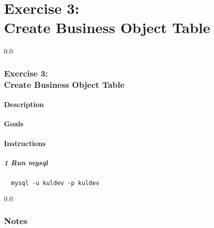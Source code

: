 \part*{Exercise 3: \\
Create Business Object Table}

{\setlength{\baselineskip}%
  {0.0\baselineskip}
  \section*{\flushright Exercise 3: \\
Create Business Object Table}
  \hrulefill \par}

\subsection*{Description}

\subsection*{Goals}

\subsection*{Instructions}
\subsubsection*{1 Run mysql}
\begin{verbatim}
  mysql -u kuldev -p kuldev
\end{verbatim}
\newpage
{\setlength{\baselineskip}%
  {0.0\baselineskip}
  \section*{Notes}
  \hrulefill \par}